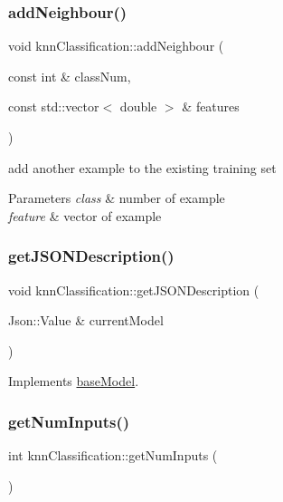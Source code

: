 \subsubsection{\texorpdfstring{add\+Neighbour()}{addNeighbour()}}
{\footnotesize\ttfamily void knn\+Classification\+::add\+Neighbour (\begin{DoxyParamCaption}\item[{const int \&}]{class\+Num,  }\item[{const std\+::vector$<$ double $>$ \&}]{features }\end{DoxyParamCaption})}

add another example to the existing training set 
\begin{DoxyParams}{Parameters}
{\em class} & number of example \\
\hline
{\em feature} & vector of example \\
\hline
\end{DoxyParams}
\mbox{\label{classknn_classification_a456b4b1b0fedb8f8fbe6d810bd80ceb8}} 
\subsubsection{\texorpdfstring{get\+J\+S\+O\+N\+Description()}{getJSONDescription()}}
{\footnotesize\ttfamily void knn\+Classification\+::get\+J\+S\+O\+N\+Description (\begin{DoxyParamCaption}\item[{Json\+::\+Value \&}]{current\+Model }\end{DoxyParamCaption})\hspace{0.3cm}{\ttfamily [virtual]}}



Implements \hyperlink{classbase_model_a54c7ba2132721c2f990ea2fe2313f863}{base\+Model}.

\mbox{\label{classknn_classification_a3f9c8fb78c6a66f0ab9440629140400d}} 
\subsubsection{\texorpdfstring{get\+Num\+Inputs()}{getNumInputs()}}
{\footnotesize\ttfamily int knn\+Classification\+::get\+Num\+Inputs (\begin{DoxyParamCaption}{ }\end{DoxyParamCaption})\hspace{0.3cm}{\ttfamily [virtual]}}



